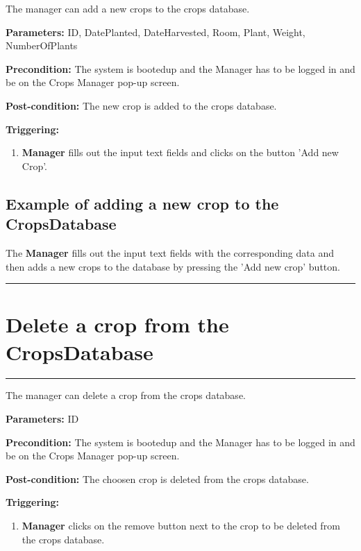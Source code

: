 The manager can add a new crops to the crops database.

\begin{description}

\item \textbf{Parameters:} ID, DatePlanted, DateHarvested, Room, Plant, Weight, NumberOfPlants
\item \textbf{Precondition:} The system is bootedup and the Manager has to be
logged in and be on the Crops Manager pop-up screen.
\item \textbf{Post-condition:} The new crop is added to the crops database.
\item \textbf{Triggering:}
\begin{enumerate}

\item \textbf{Manager} fills out the input text fields and clicks on the button 'Add new Crop'.

\end{enumerate}
\end{description}

\subsection{Example of adding a new crop to the CropsDatabase}
The \textbf{Manager} fills out the input text fields with the corresponding data and then adds a new crops to the database by pressing the 'Add new crop' button.
\hfill
\vspace{0.5cm}
\hrule




\section{Delete a crop from the CropsDatabase}
\hrule
\hfill
\vspace{0.5cm}
\label{operation:Delete a crop from the CropsDatabase}

The manager can delete a crop from the crops database.

\begin{description}

\item \textbf{Parameters:} ID
\item \textbf{Precondition:} The system is bootedup and the Manager has to be
logged in and be on the Crops Manager pop-up screen.
\item \textbf{Post-condition:} The choosen crop is deleted from the crops database.
\item \textbf{Triggering:}
\begin{enumerate}

\item \textbf{Manager} clicks on the remove button next to the crop to be deleted from the crops database.

\end{enumerate}
\end{description}

